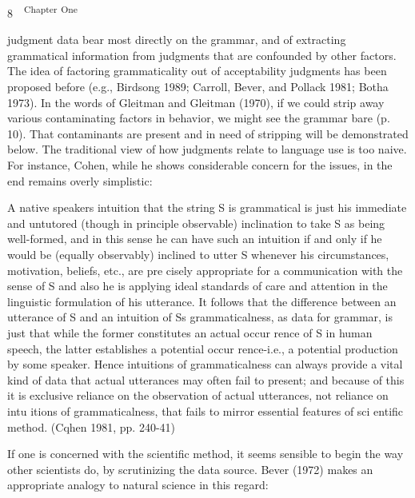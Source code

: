 \clearpage\setcounter{page}{1}\begin{styleStandard}
8\ \ \textsuperscript{Chapter}\textsuperscript{ }\textsuperscript{One}
\end{styleStandard}


\begin{styleStandard}
judgment data bear most directly on the grammar, and of extracting grammatical information from judgments that are confounded by other factors. The idea of factoring grammaticality out of acceptability judgments has been proposed before (e.g., Birdsong 1989; Carroll, Bever, and Pollack 1981; Botha 1973). In the words of Gleitman and Gleitman (1970), {\textquotedbl}if we could strip away various contaminating factors in behavior, we might see the grammar bare{\textquotedbl} (p. 10). That contaminants are present and in need of stripping will be demonstrated below. The traditional view of how judgments relate to language use is too naive. For instance, Cohen, while he shows considerable concern for the issues, in the end remains overly simplistic:
\end{styleStandard}


\begin{styleStandard}
A native speaker{\textquotesingle}s intuition that the string S is grammatical is just his immediate and untutored (though in principle observable) inclination to take S as being well-formed, and in this sense he can have such an intuition if and only if he would be (equally observably) inclined to utter S whenever his circumstances, motivation, beliefs, etc., are pre\- cisely appropriate for a communication with the sense of S and also he is applying ideal standards of care and attention in the linguistic formulation of his utterance. It follows that the difference between an utterance of S and an intuition of S{\textquotesingle}s grammaticalness, as data for grammar, is just that while the former constitutes an actual occur\- rence of S in human speech, the latter establishes a potential occur\- rence-i.e., a potential production by some speaker. Hence intuitions of grammaticalness can always provide a vital kind of data that actual utterances may often fail to present; and because of this it is exclusive reliance on the observation of actual utterances, not reliance on intu\- itions of grammaticalness, that fails to mirror essential features of sci\- entific method. (Cqhen 1981, pp. 240-41)
\end{styleStandard}


\begin{styleStandard}
If one is concerned with the scientific method, it seems sensible to begin the way other scientists do, by scrutinizing the data source. Bever (1972) makes an appropriate analogy to natural science in this regard:
\end{styleStandard}


